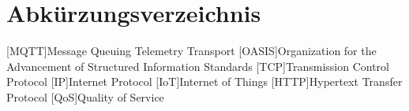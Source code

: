 

\section*{Abkürzungsverzeichnis}
\begin{acronym}[OASIS] %
    [MQTT]{Message Queuing Telemetry Transport}
    [OASIS]{Organization for the Advancement of Structured Information Standards}
    [TCP]{Transmission Control Protocol}
    [IP]{Internet Protocol}
    [IoT]{Internet of Things}
    [HTTP]{Hypertext Transfer Protocol}
    [QoS]{Quality of Service}
\end{acronym}
